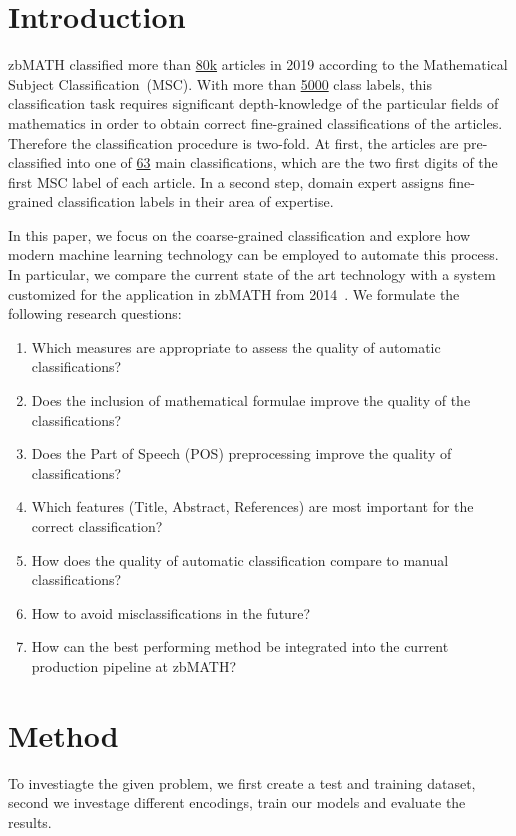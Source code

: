 \section{Introduction}\label{sec:intro}
zbMATH classified more than 
\href{https://zbmath.org/?q=%2A+py%3A2019}%
{80k} articles in 2019 according to the Mathematical Subject Classification~(MSC).
With more than
\href{https://msc2020.org}%
{5000} class labels, this classification task requires significant depth-knowledge of the particular fields of mathematics in order to obtain correct fine-grained classifications of the articles.
Therefore the classification procedure is two-fold.
At first, the articles are pre-classified into one of \href{https://msc2020.org}%
{63} main classifications, which are the two first digits of the first MSC label of each article.
In a second step, domain expert assigns fine-grained classification labels in their area of expertise.

In this paper, we focus on the coarse-grained classification and explore how modern machine learning technology can be employed to automate this process.
In particular, we compare the current state of the art technology with a system customized for the application in zbMATH from 2014~\cite{SchonebergS14}.
We formulate the following research questions:
\begin{enumerate}
  \item Which measures are appropriate to assess the quality of automatic classifications?
  \item Does the inclusion of mathematical formulae improve the quality of the classifications?
  \item Does the Part of Speech (POS) preprocessing improve the quality of classifications?
  \item Which features (Title, Abstract, References) are most important for the correct classification?
  \item How does the quality of automatic classification compare to manual classifications?
  \item How to avoid misclassifications in the future?
  \item How can the best performing method be integrated into the current production pipeline at zbMATH?
\end{enumerate}
\section{Method}\label{sec:method}
To investiagte the given problem, we first create a test and training dataset, second we investage different encodings, train our models and evaluate the results.
